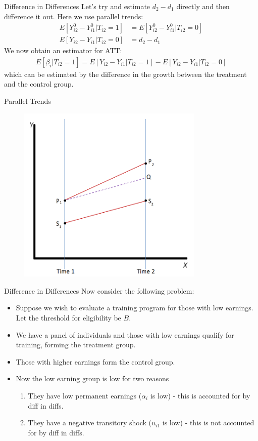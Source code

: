 \begin{frame}{Difference in Differences} 
Let's try and estimate $d_2- d_1$ directly and then difference it out. Here we use \alert{parallel trends}:
\begin{align*}
E[Y_{i2}^0 - Y_{i1}^0 | T_{i2}=1]  &= E[Y_{i2}^0 - Y_{i1}^0 | T_{i2}=0] \\
E[Y_{i2} - Y_{i1} | T_{i2}=0] & = d_2-d_1
\end{align*}
We now obtain an estimator for ATT:
\begin{align*}
E[\beta_{i}| T_{i2}=1]  = E[Y_{i2} - Y_{i1} | T_{i2}=1] - E[Y_{i2} - Y_{i1} | T_{i2}=0]  
\end{align*}
which can be estimated by the difference in the growth between the treatment and the control group.
\end{frame}

\begin{frame}{Parallel Trends}
\begin{figure}
\centering
\includegraphics[width=3.5in]{./resources/parallel-trends}
\end{figure}
\end{frame}

\begin{frame}{Difference in Differences}
Now consider the following problem:
\begin{itemize}
\item Suppose we wish to evaluate a training program for those with low
earnings. Let the threshold for eligibility be $B$.
\item We have a panel of individuals and those with low earnings qualify for
training, forming the treatment group.
\item Those with higher earnings form the control group. 
\item Now the low earning group is low for two reasons
\begin{enumerate}
\item They have low permanent earnings ($\alpha_i$ is low) - this is accounted for by diff in diffs.
\item They have a negative transitory shock ($u_{i1}$ is low) - this is not accounted for by diff in diffs.
\end{enumerate} 
\end{itemize}
\end{frame} 

